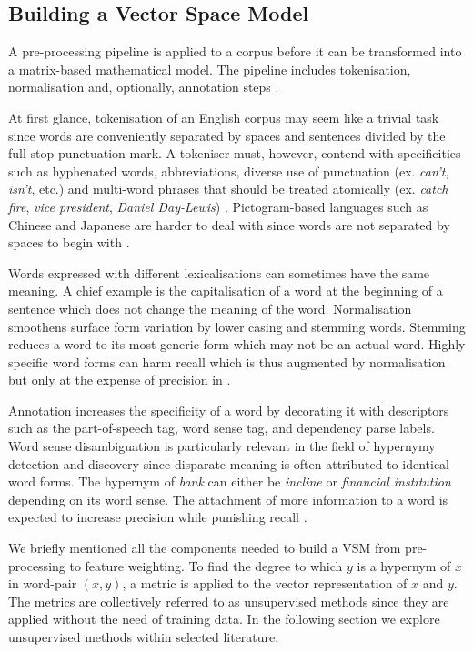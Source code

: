 \subsection{Building a Vector Space Model}
A pre-processing pipeline is applied to a corpus before it can be transformed into a matrix-based mathematical model.  The pipeline includes tokenisation, normalisation and, optionally, annotation steps \citep{turney2010frequency}.

At first glance, tokenisation of an English corpus may seem like a trivial task since words are conveniently separated by spaces and sentences divided by the full-stop punctuation mark.  A tokeniser must, however, contend with specificities such as hyphenated words, abbreviations, diverse use of punctuation (ex. \textit{can’t}, \textit{isn’t}, etc.) and multi-word phrases that should be treated atomically (ex. \textit{catch fire}, \textit{vice president}, \textit{Daniel Day-Lewis}) .  Pictogram-based languages such as Chinese and Japanese are harder to deal with since words are not separated by spaces to begin with \citep{turney2010frequency}.

Words expressed with different lexicalisations can sometimes have the same meaning.  A chief example is the capitalisation of a word at the beginning of a sentence which does not change the meaning of the word. Normalisation smoothens surface form variation by lower casing and stemming words. Stemming reduces a word to its most generic form which may not be an actual word.  Highly specific word forms can harm recall which is thus augmented by normalisation but only at the expense of precision \citep{kraaij1996viewing} in \citep{turney2010frequency}.

Annotation increases the specificity of a word by decorating it with descriptors such as the part-of-speech tag, word sense tag, and dependency parse labels.  Word sense disambiguation is particularly relevant in the field of hypernymy detection and discovery since disparate meaning is often attributed to identical word forms.  The hypernym of \textit{bank} can either be \textit{incline} or \textit{financial institution} depending on its word sense.  The attachment of more information to a word is expected to increase precision while punishing recall \citep{turney2010frequency}.

We briefly mentioned all the components needed to build a \ac{VSM} from pre-processing to feature weighting.  To find the degree to which $y$ is a hypernym of $x$ in word-pair $(x, y)$, a metric is applied to the vector representation of $x$ and $y$.  The metrics are collectively referred to as unsupervised methods since they are applied without the need of training data.  In the following section we explore unsupervised methods within selected literature.


